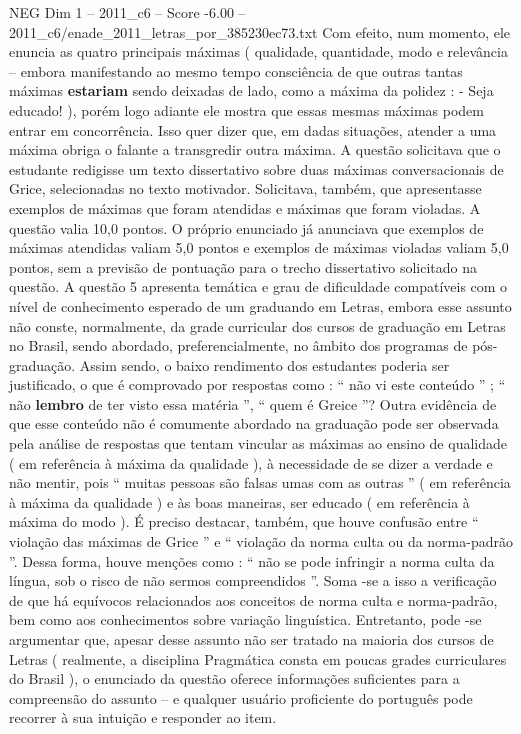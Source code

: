 \begin{textsample}{NEG Dim 1 – 2011\_c6 – Score -6.00 – 2011\_c6/enade\_2011\_letras\_por\_385230ec73.txt}
Com efeito, num momento, ele enuncia as quatro principais máximas ( qualidade, quantidade, modo e relevância – embora manifestando ao mesmo tempo consciência de que outras tantas máximas \textbf{estariam} sendo deixadas de lado, como a máxima da polidez : - Seja educado! ), porém logo adiante ele mostra que essas mesmas máximas podem entrar em concorrência.
Isso quer dizer que, em dadas situações, atender a uma máxima obriga o falante a transgredir outra máxima.
A questão solicitava que o estudante redigisse um texto dissertativo sobre duas máximas conversacionais de Grice, selecionadas no texto motivador.
Solicitava, também, que apresentasse exemplos de máximas que foram atendidas e máximas que foram violadas.
A questão valia 10,0 pontos.
O próprio enunciado já anunciava que exemplos de máximas atendidas valiam 5,0 pontos e exemplos de máximas violadas valiam 5,0 pontos, sem a previsão de pontuação para o trecho dissertativo solicitado na questão.
A questão 5 apresenta temática e grau de dificuldade compatíveis com o nível de conhecimento esperado de um graduando em Letras, embora esse assunto não conste, normalmente, da grade curricular dos cursos de graduação em Letras no Brasil, sendo abordado, preferencialmente, no âmbito dos programas de pós-graduação.
Assim sendo, o baixo rendimento dos estudantes poderia ser justificado, o que é comprovado por respostas como : “ não vi este conteúdo ” ; “ não \textbf{lembro} de ter visto essa matéria ”, “ quem é Greice ”?
Outra evidência de que esse conteúdo não é comumente abordado na graduação pode ser observada pela análise de respostas que tentam vincular as máximas ao ensino de qualidade ( em referência à máxima da qualidade ), à necessidade de se dizer a verdade e não mentir, pois “ muitas pessoas são falsas umas com as outras ” ( em referência à máxima da qualidade ) e às boas maneiras, ser educado ( em referência à máxima do modo ).
É preciso destacar, também, que houve confusão entre “ violação das máximas de Grice ” e “ violação da norma culta ou da norma-padrão ”.
Dessa forma, houve menções como : “ não se pode infringir a norma culta da língua, sob o risco de não sermos compreendidos ”.
Soma -se a isso a verificação de que há equívocos relacionados aos conceitos de norma culta e norma-padrão, bem como aos conhecimentos sobre variação linguística.
Entretanto, pode -se argumentar que, apesar desse assunto não ser tratado na maioria dos cursos de Letras ( realmente, a disciplina Pragmática consta em poucas grades curriculares do Brasil ), o enunciado da questão oferece informações suficientes para a compreensão do assunto – e qualquer usuário proficiente do português pode recorrer à sua intuição e responder ao item.

\end{textsample}
